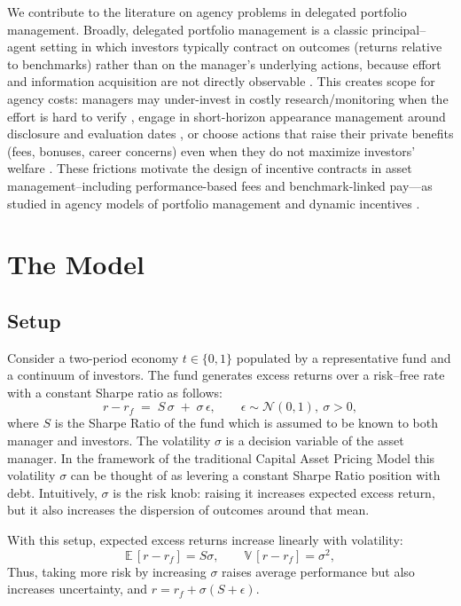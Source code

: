 \documentclass[11pt]{article}
\def\E{{\mathbb{E}}\,}
\def\V{{\mathbb{V}}\,}
\newcommand{\Normal}{\mathcal{N}}
\newcommand{\Sharpe}{S}
\newcommand{\rf}{r_f}
\begin{document}
We contribute to the literature on agency problems in delegated portfolio management. Broadly, delegated portfolio management is a classic principal--agent setting in which investors typically contract on outcomes (returns relative to benchmarks) rather than on the manager's underlying actions, because effort and information acquisition are not directly observable \citep{Holmstrom1979,AdmatiPfleiderer1997}. This creates scope for agency costs: managers may under-invest in costly research/monitoring when the effort is hard to verify \citep{Holmstrom1979,JensenMeckling1976}, engage in short-horizon appearance management around disclosure and evaluation dates \citep{Musto1999,CarhartKanielMustoReed2002}, or choose actions that raise their private benefits (fees, bonuses, career concerns) even when they do not maximize investors' welfare \citep{JensenMeckling1976}. These frictions motivate the design of incentive contracts in asset management--including performance-based fees and benchmark-linked pay---as studied in agency models of portfolio management and dynamic incentives \citep{Starks1987,AdmatiPfleiderer1997,HolmstromMilgrom1987}.


\section{The Model}
\label{sec:environment}
\subsection{Setup}
Consider a two-period economy $t\in\{0,1\}$ populated by a representative fund and a continuum of investors. The fund generates excess returns over a risk–free rate with a constant Sharpe ratio as follows:
\begin{equation}
    r-\rf \;=\; \Sharpe\,\sigma \;+\; \sigma\,\epsilon, 
    \qquad \epsilon \sim \Normal(0,1),\ \sigma>0,
\end{equation}
where \(\Sharpe\) is the Sharpe Ratio of the fund which is assumed to be known to both manager and investors. The volatility $\sigma$ is a decision variable of the asset manager. In the framework of the traditional Capital Asset Pricing Model this volatility $\sigma$ can be thought of as levering a constant Sharpe Ratio position with debt. 
Intuitively, $\sigma$ is the risk knob: raising it increases expected excess return, but it also increases the dispersion of outcomes around that mean.

With this setup, expected excess returns increase linearly with volatility:
\[
\E[r-\rf]=\Sharpe \sigma,\qquad \V[r-\rf]=\sigma^2,
\]
Thus, taking more risk by increasing $\sigma$ raises average performance but also increases uncertainty, and \(r=\rf+\sigma(\Sharpe+\epsilon)\).
\end{document}
